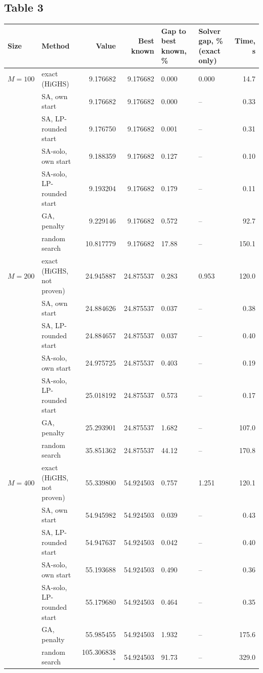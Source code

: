 \documentclass[11pt,a4paper]{article}
\begin{document}
\subsection*{Table 3}
{\small
\begin{tabular}{@{}lp{3.8cm}rrp{2.0cm}p{2.2cm}r@{}}
\toprule
Size & Method & Value & Best known & Gap to best known, \% & Solver gap, \% (exact only) & Time, s\\
\midrule
$M{=}100$ & exact (HiGHS)            & 9.176682 & 9.176682 & 0.000 & 0.000 & 14.7\\
          & SA, own start            & 9.176682 & 9.176682 & 0.000 & -- & 0.33\\
          & SA, LP-rounded start     & 9.176750 & 9.176682 & 0.001 & -- & 0.31\\
          & SA-solo, own start       & 9.188359 & 9.176682 & 0.127 & -- & 0.10\\
          & SA-solo, LP-rounded start& 9.193204 & 9.176682 & 0.179 & -- & 0.11\\
          & GA, penalty              & 9.229146 & 9.176682 & 0.572 & -- & 92.7\\
          & random search            & 10.817779& 9.176682 & 17.88 & -- & 150.1\\
\addlinespace
$M{=}200$ & exact (HiGHS, not proven)& 24.945887& 24.875537& 0.283 & 0.953 & 120.0\\
          & SA, own start            & 24.884626& 24.875537& 0.037 & -- & 0.38\\
          & SA, LP-rounded start     & 24.884657& 24.875537& 0.037 & -- & 0.40\\
          & SA-solo, own start       & 24.975725& 24.875537& 0.403 & -- & 0.19\\
          & SA-solo, LP-rounded start& 25.018192& 24.875537& 0.573 & -- & 0.17\\
          & GA, penalty              & 25.293901& 24.875537& 1.682 & -- & 107.0\\
          & random search            & 35.851362& 24.875537& 44.12 & -- & 170.8\\
\addlinespace
$M{=}400$ & exact (HiGHS, not proven)& 55.339800& 54.924503& 0.757 & 1.251 & 120.1\\
          & SA, own start            & 54.945982& 54.924503& 0.039 & -- & 0.43\\
          & SA, LP-rounded start     & 54.947637& 54.924503& 0.042 & -- & 0.40\\
          & SA-solo, own start       & 55.193688& 54.924503& 0.490 & -- & 0.36\\
          & SA-solo, LP-rounded start& 55.179680& 54.924503& 0.464 & -- & 0.35\\
          & GA, penalty              & 55.985455& 54.924503& 1.932 & -- & 175.6\\
          & random search            & 105.306838$^*$& 54.924503& 91.73 & -- & 329.0\\
\bottomrule
\end{tabular}}
\end{document}
